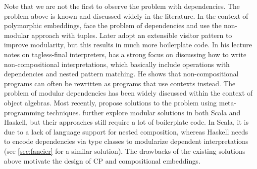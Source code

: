 Note that we are not the first to observe the problem with dependencies. The
problem above is known and discussed widely in the literature. In the context of
polymorphic embeddings, \citet{hofer2008polymorphic} face the problem of
dependencies and use the non-modular approach with tuples. Later
\citet{hofer2010modular} adopt an extensible visitor pattern to improve
modularity, but this results in much more boilerplate code. In his lecture notes
on tagless-final interpreters, \citet{kiselyov2010typed} has a strong focus on
discussing how to write non-compositional interpretations, which basically
include operations with dependencies and nested pattern matching. He shows that
non-compositional programs can often be rewritten as programs that use contexts
instead. The problem of modular dependencies has been widely discussed within
the context of object algebras. Most recently,
\citet{zhang2017evf,zhang2020castor} propose solutions to the problem using
meta-programming techniques. \citet{zhang2019shallow} further explore modular
solutions in both Scala and Haskell, but their approaches still require a lot of
boilerplate code. In Scala, it is due to a lack of language support for nested
composition, whereas Haskell needs to encode dependencies via type classes to
modularize dependent interpretations (see \autoref{sec:fancier} for a similar
solution). The drawbacks of the existing solutions above motivate the design of
CP and compositional embeddings.

